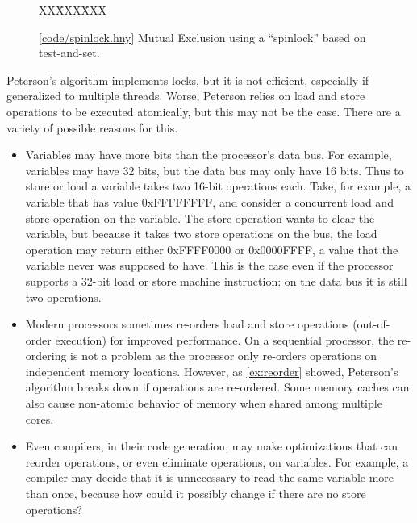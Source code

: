 \documentclass{report}
\newcommand{\harmonysource}[1]{
\begin{tabbing}
XX\=XXX\=XXX\kill
    
\end{tabbing}
}
\newcommand{\harmonylink}[1]{%
[\href{https://harmony.cs.cornell.edu/#1}{\underline{#1}}]%
}
\newenvironment{code}{
\tcolorbox
}{
\endtcolorbox
}
\begin{document}
%

\begin{figure}
\begin{code}
\harmonysource{spinlock}
\end{code}
\caption{\harmonylink{code/spinlock.hny} Mutual Exclusion using a ``spinlock'' based on test-and-set.}
\label{fig:tas}
\end{figure}

Peterson's algorithm implements locks, but it is not efficient,
especially if generalized to multiple threads.
Worse, Peterson relies on load and store operations to be executed
atomically, but this may not be the case.
There are a variety of possible reasons for this.

\begin{itemize}
\item Variables may have more bits than the processor's data bus.
For example, variables may have 32 bits, but the data bus may only
have 16 bits.  Thus to store or load a variable takes two 16-bit
operations each.  Take, for example, a variable that has value
0xFFFFFFFF, and consider a concurrent load and store operation on
the variable.
The store operation wants to clear the variable, but because it
takes two store operations on the bus, the load operation may
return either 0xFFFF0000 or 0x0000FFFF, a value that the variable
never was supposed to have.
This is the case even if the processor supports a 32-bit load or
store machine instruction: on the data bus it is still two
operations.
\item Modern processors sometimes re-orders load and store operations
(out-of-order execution) for improved performance.  On a sequential processor,
the re-ordering is not a problem as the processor only re-orders
operations on independent memory locations.  However, as \autoref{ex:reorder}
showed, Peterson's algorithm breaks down if operations are re-ordered.
Some memory caches can also cause non-atomic behavior of memory when shared
among multiple cores.
\item Even compilers, in their code generation, may make optimizations
that can reorder operations, or even eliminate operations, on variables.
For example, a compiler may decide that it is unnecessary to read the same
variable more than once, because how could it possibly change if there
are no store operations?
\end{itemize}
\end{document}
